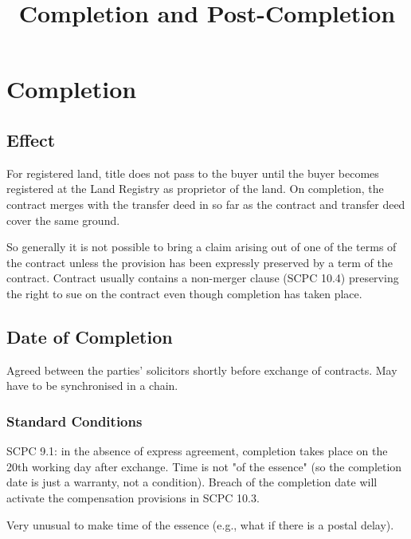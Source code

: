 \documentclass[
]{article}
\title{Completion and Post-Completion}
\author{}
\date{}
\begin{document}
\maketitle

{
\setcounter{tocdepth}{3}
\tableofcontents
}
\hypertarget{completion}{%
\section{Completion}\label{completion}}

\hypertarget{effect}{%
\subsection{Effect}\label{effect}}

For registered land, title does not pass to the buyer until the buyer
becomes registered at the Land Registry as proprietor of the land. On
completion, the contract merges with the transfer deed in so far as the
contract and transfer deed cover the same ground.

So generally it is not possible to bring a claim arising out of one of
the terms of the contract unless the provision has been expressly
preserved by a term of the contract. Contract usually contains a
non-merger clause (SCPC 10.4) preserving the right to sue on the
contract even though completion has taken place.

\hypertarget{date-of-completion}{%
\subsection{Date of Completion}\label{date-of-completion}}

Agreed between the parties' solicitors shortly before exchange of
contracts. May have to be synchronised in a chain.

\hypertarget{standard-conditions}{%
\subsubsection{Standard Conditions}\label{standard-conditions}}

SCPC 9.1: in the absence of express agreement, completion takes place on
the 20th working day after exchange. Time is not "of the essence" (so
the completion date is just a warranty, not a condition). Breach of the
completion date will activate the compensation provisions in SCPC 10.3.

Very unusual to make time of the essence (e.g., what if there is a
postal delay).
\end{document}
